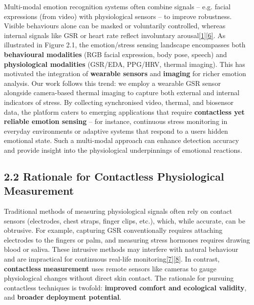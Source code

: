 \documentclass[12pt,a4paper]{article}
\begin{document}
Multi-modal emotion recognition systems often combine signals -- e.g. facial expressions (from video) with physiological sensors -- to improve robustness. Visible behaviours alone can be masked or voluntarily controlled, whereas internal signals like GSR or heart rate reflect involuntary arousal\href{https://www.mdpi.com/2076-3417/10/8/2924\#:~:text=primarily\%20use\%20visual\%20information\%20for,it\%20might\%20be\%20possible\%20to}{{[}1{]}}\href{https://www.mdpi.com/2076-3417/10/8/2924\#:~:text=expression\%20is\%20inherently\%20a\%20voluntary,outline\%20the\%20advantages\%20and\%20the}{{[}6{]}}. As illustrated in Figure 2.1, the emotion/stress sensing landscape encompasses both \textbf{behavioural modalities} (RGB facial expression, body pose, speech) and \textbf{physiological modalities} (GSR/EDA, PPG/HRV, thermal imaging). This has motivated the integration of \textbf{wearable sensors} and \textbf{imaging} for richer emotion analysis. Our work follows this trend: we employ a wearable GSR sensor alongside camera-based thermal imaging to capture both external and internal indicators of stress. By collecting synchronised video, thermal, and biosensor data, the platform caters to emerging applications that require \textbf{contactless yet reliable emotion sensing} -- for instance, continuous stress monitoring in everyday environments or adaptive systems that respond to a user\textquotesingle s hidden emotional state. Such a multi-modal approach can enhance detection accuracy and provide insight into the physiological underpinnings of emotional reactions.

\subsection{2.2 Rationale for Contactless Physiological Measurement}\label{rationale-for-contactless-physiological-measurement}

Traditional methods of measuring physiological signals often rely on contact sensors (electrodes, chest straps, finger clips, etc.), which, while accurate, can be obtrusive. For example, capturing GSR conventionally requires attaching electrodes to the fingers or palm, and measuring stress hormones requires drawing blood or saliva. These intrusive methods may interfere with natural behaviour and are impractical for continuous real-life monitoring\href{https://www.frontiersin.org/journals/computer-science/articles/10.3389/fcomp.2020.00039/full\#:~:text=provide\%20people\%20with\%20a\%20means,the\%20basis\%20for\%20such\%20support}{{[}7{]}}\href{https://pmc.ncbi.nlm.nih.gov/articles/PMC10385045/\#:~:text=Numerous\%20studies\%20have\%20investigated\%20the,natural\%20physiological\%20responses\%20under\%20study}{{[}8{]}}. In contrast, \textbf{contactless measurement} uses remote sensors like cameras to gauge physiological changes without direct skin contact. The rationale for pursuing contactless techniques is twofold: \textbf{improved comfort and ecological validity}, and \textbf{broader deployment potential}.
\end{document}

